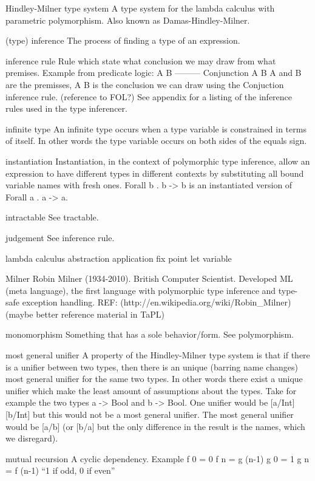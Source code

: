 Hindley-Milner type system
A type system for the lambda calculus with parametric polymorphism. Also known as Damas-Hindley-Milner.

(type) inference
The process of finding a type of an expression. 

inference rule
Rule which state what conclusion we may draw from what premises.
Example from predicate logic:
A       B
--------- Conjunction
A \land B
A and B are the premisses, A \land B is the conclusion we can draw using the Conjuction inference rule.
(reference to FOL?)
See appendix for a listing of the inference rules used in the type inferencer.

infinite type
An infinite type occurs when a type variable is constrained in terms of itself. In other words the type variable occurs on both sides of the equals sign.

instantiation
Instantiation, in the context of polymorphic type inference, allow an expression to have different types in different contexts by substituting all bound variable names with fresh ones. Forall b . b -> b is an instantiated version of Forall a . a -> a.

intractable
See tractable.

judgement
See inference rule.

lambda calculus
  abstraction
  application
  fix point
  let
  variable

Milner
Robin Milner (1934-2010). British Computer Scientist. Developed ML (meta language), the first language with polymorphic type inference and type-safe exception handling. REF: (http://en.wikipedia.org/wiki/Robin\_Milner)
(maybe better reference material in TaPL)

monomorphism
Something that has a sole behavior/form. See polymorphism. 

most general unifier
A property of the Hindley-Milner type system is that if there is a unifier between two types, then there is an unique (barring name changes) most general unifier for the same two types. In other words there exist a unique unifier which make the least amount of assumptions about the types.
Take for example the two types a -> Bool and b -> Bool. One unifier would be
[a/Int][b/Int] but this would not be a most general unifier. The most general unifier would be [a/b] (or [b/a] but the only difference in the result is the names, which we disregard).

mutual recursion
A cyclic dependency.
Example
f 0 = 0
f n = g (n-1)
g 0 = 1
g n = f (n-1)
``1 if odd, 0 if even''

